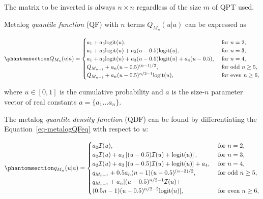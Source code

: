 \documentclass[
  letterpaper,
  DIV=11,
  numbers=noendperiod]{scrartcl}
\begin{document}
The matrix to be inverted is always \(n \times n\) regardless of the
size \(m\) of QPT used.

Metalog \emph{quantile function} (QF) with \(n\) terms
\(Q_{M_n}(u\vert a)\) can be expressed as

\begin{equation}\phantomsection\label{eq-metalogQFeq}{
\begin{gathered}
Q_{M_n}(u\vert a)=\begin{cases}
a_1+a_2\text{logit}(u), &\text{ for } n=2, \\
a_1+a_2\text{logit}(u)+a_3(u-0.5)\text{logit}(u), &\text{ for } n=3, \\
a_1+a_2\text{logit}(u)+a_3(u-0.5)\text{logit}(u)+a_4(u-0.5), &\text{ for } n=4, \\
Q_{M_{n-1}} + a_n(u-0.5)^{(n-1)/2}, &\text{ for odd } n \geq 5, \\
Q_{M_{n-1}} + a_n(u-0.5)^{n/2-1}\text{logit}(u), &\text{ for even } n \geq 6, \\
\end{cases}
\end{gathered}
}\end{equation}

where \(u \in [0,1]\) is the cumulative probability and \(a\) is the
size-\(n\) parameter vector of real constants \(a=\{a_1\dots a_n\}\).

The metalog \emph{quantile density function} (QDF) can be found by
differentiating the Equation~\ref{eq-metalogQFeq} with respect to \(u\):

\begin{equation}\phantomsection\label{eq-metalogQDFeq}{
\begin{gathered}
q_{M_n}(u\vert a)=\begin{cases}
a_2\mathcal I(u), &\text{ for } n=2, \\
a_2\mathcal I(u)+a_3\left[(u-0.5)\mathcal I(u)+\text{logit}(u) \right],  &\text{ for } n=3, \\
a_2\mathcal I(u) + a_3\left[(u-0.5)\mathcal I(u)+\text{logit}(u) \right]+ a_4,   &\text{ for } n=4, \\
q_{M_{n-1}} + 0.5a_n(n-1)(u-0.5)^{(n-3)/2},  &\text{ for odd } n \geq 5, \\
q_{M_{n-1}} + a_n[(u-0.5)^{n/2-1}\mathcal I(u)+\\ (0.5n-1)(u-0.5)^{n/2-2}\text{logit}(u)],  &\text{ for even } n \geq 6, \\
\end{cases}
\end{gathered}
}\end{equation}
\end{document}

